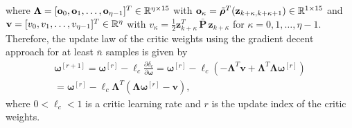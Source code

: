 \documentclass[conference]{IEEEtran}
\begin{document}
 where $\bm{\Lambda} = [{\bf o}_0,{\bf o}_1,\ldots,{\bf o}_{\eta-1}]^T \in \mathbb{R}^{\eta\times 15}$ with ${\bf o}_\kappa = \tilde{\bm{\rho}}^T({\bf z}_{k+\kappa, k+\kappa+1}) \in \mathbb{R}^{1\times 15}$ and ${\bf v} =[v_0,v_1,\ldots,v_{\eta-1}]^T \in \mathbb{R}^{\eta}$ with $v_\kappa = \frac{1}{2}\mathbf{z}_{k+\kappa}^T \, \bar{\mathbf{P}} \, \mathbf{z}_{k+\kappa}$ for $\kappa = 0,1,\ldots, \eta-1$. %
 Therefore, the update law of the critic weights using the gradient decent approach for at least $\bar n$ samples is given by %
 \begin{multline}
   \bm{\omega}^{[r+1]} = \bm{\omega}^{[r]} - \ell_c\frac{\partial\delta_c}{\partial \bm{\omega}} = \bm{\omega}^{[r]} - \ell_c\left(-\bm{\Lambda}^T\mathbf{v} + \bm{\Lambda}^T \bm{\Lambda}\bm{\omega}^{[r]}\right)\\ 
 =\bm{\omega}^{[r]} - \ell_c \bm{\Lambda}^T\left(\bm{\Lambda}\bm{\omega}^{[r]}-\mathbf{v}\right), 
 \label{eq:criticWeights}
 \end{multline}
 where $0<\ell_c<1$ is a critic learning rate and $r$ is the  update index of the critic weights. 
\end{document}

